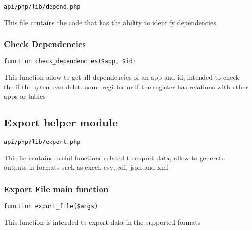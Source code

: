 \documentclass[a4paper]{article}
\begin{document}
\begin{lstlisting}
api/php/lib/depend.php
\end{lstlisting}

This file contains the code that has the ability to identify dependencies

\hypertarget{toc437}{}
\subsubsection{Check Dependencies}

\begin{lstlisting}
function check_dependencies($app, $id)
\end{lstlisting}

This function allow to get all dependencies of an app and id, intended to check
the if the sytem can delete some register or if the register has relations with
other apps or tables

\hypertarget{toc438}{}
\subsection{Export helper module}

\begin{lstlisting}
api/php/lib/export.php
\end{lstlisting}

This fie contains useful functions related to export data, allow to generate outputs in formats
suck as excel, csv, edi, json and xml

\hypertarget{toc439}{}
\subsubsection{Export File main function}

\begin{lstlisting}
function export_file($args)
\end{lstlisting}

This function is intended to export data in the supported formats
\end{document}
